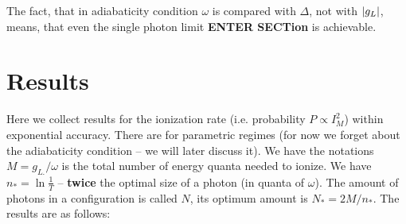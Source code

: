   The fact, that in adiabaticity condition  $\omega  $ is compared with $ \Delta $, not with $ \left|g_L\right| $, means, that even the single photon limit \textbf{ENTER SECTion} is achievable. 
\section{Results}

Here we collect results for the ionization rate (i.e. probability
$P\propto I_{M}^{2}$) within exponential accuracy. There are for
parametric regimes (for now we forget about the adiabaticity condition
-- we will later discuss it). We have the notations $M=g_{L.}/\omega$
is the total number of energy quanta needed to ionize. We have $n_{*}=\ln\frac{1}{T}$
-- \textbf{twice} the optimal size of a photon (in quanta of $\omega$).
The amount of photons in a configuration is called $N$, its optimum
amount is $N_{*}=2M/n_{*}$. The results are as follows:

